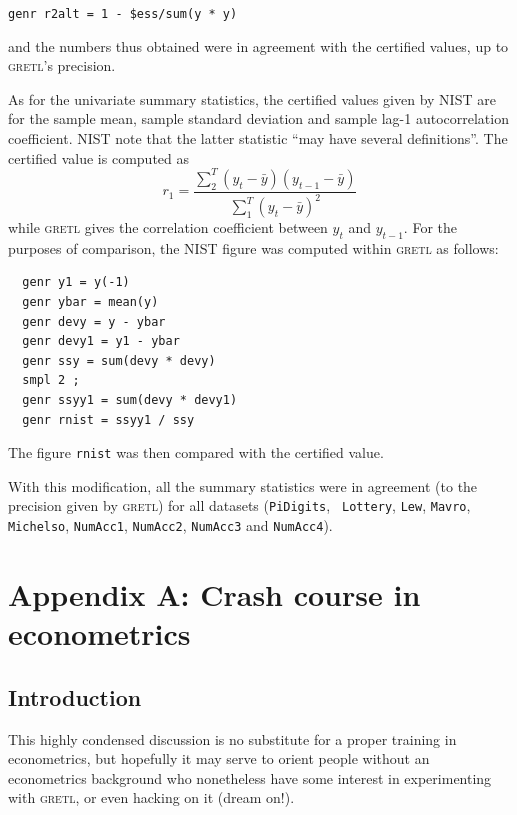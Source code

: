 \documentclass{article}
\begin{document}
\begin{center}
\texttt{genr r2alt = 1 - \$ess/sum(y * y)}  
\end{center}

\noindent and the numbers thus
obtained were in agreement with the certified values, up to
\textsc{gretl}'s precision.

As for the univariate summary statistics, the certified values given
by NIST are for the sample mean, sample standard deviation and sample
lag-1 autocorrelation coefficient.  NIST note that the latter
statistic ``may have several definitions''.  The certified value is
computed as 
$$r_1 = \frac{\sum^T_2 (y_t - \bar{y})(y_{t-1} - \bar{y})}%
        {\sum^T_1 (y_t - \bar{y})^2}$$
while \textsc{gretl} gives the correlation coefficient between $y_t$ and
$y_{t-1}$.  For the purposes of comparison, the NIST figure was
computed within \textsc{gretl} as follows:

\begin{verbatim}
  genr y1 = y(-1)
  genr ybar = mean(y)
  genr devy = y - ybar
  genr devy1 = y1 - ybar
  genr ssy = sum(devy * devy)
  smpl 2 ;
  genr ssyy1 = sum(devy * devy1)
  genr rnist = ssyy1 / ssy
\end{verbatim}

\noindent The figure \texttt{rnist} was then compared with the certified value.

With this modification, all the summary statistics were in agreement
(to the precision given by \textsc{gretl}) for all datasets
(\texttt{PiDigits}, \texttt{ Lottery}, \texttt{Lew}, \texttt{Mavro},
\texttt{Michelso}, \texttt{NumAcc1}, \texttt{NumAcc2},
\texttt{NumAcc3} and \texttt{NumAcc4}).

\clearpage

\section*{Appendix A: Crash course in econometrics}
\label{crash}

\subsection{Introduction}

This highly condensed discussion is no substitute for a proper
training in econometrics, but hopefully it may serve to orient people
without an econometrics background who nonetheless have some interest
in experimenting with \textsc{gretl}, or even hacking on it (dream on!).
\end{document}
